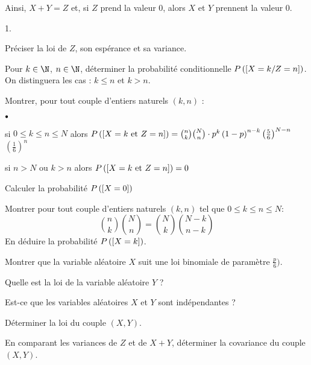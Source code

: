 \documentclass[11pt]{article}%
\begin{document}
Ainsi, $X + Y = Z$ et, si $Z$ prend la valeur 0, alors $X$ et $Y$
prennent la
valeur 0.

\begin{noliste}{1.}
 \setlength{\itemsep}{4mm}
\item Préciser la loi de $Z$, son espérance et sa variance.

\item Pour $k\in \N$, $n\in \N$, déterminer la
probabilité conditionnelle $P\left(\left[ {X = k/Z = n} \right]\right)$. On
distinguera les cas : $k\le
n $ et $k>n.$

\item Montrer, pour tout couple d'entiers naturels $(k,n)$ :

\begin{noliste}{$\scriptstyle \bullet$}
\item si $0\leq k\leq n\leq N$ alors $ P\left(\left[ { X = k\text{ et }Z =
n} \right]\right) = \binom{n}{k}\binom{N}{n}\cdot p^{k}\left( 1-p\right)
^{n-k}\left( \frac{5}{6}\right) ^{N-n}$ $\left( \frac{1}{6}\right)
^{n}$

\item si $n>N$ ou $k>n$ alors $ P\left(\left[ { X = k\text{ et }Z =
n} \right]\right) = 0$
\end{noliste}

\item Calculer la probabilité $P\left(\left[ {X = 0} \right]\right)$

\item Montrer pour tout couple d'entiers naturels $(k,n)$ tel que
$0\leq
k\leq n\leq N :$
\[
\binom{n}{k}\binom{N}{n} = \binom{N}{k}\binom{N-k}{n-k} 
\]
En déduire la probabilité $P\left(\left[ {X = k} \right]\right)$.

\item Montrer que la variable aléatoire $X$ suit une loi binomiale de
paramètre $\frac{p}{6})$.

Quelle est la loi de la variable aléatoire $Y$ ?

\item Est-ce que les variables aléatoires $X$ et $Y$ sont indépendantes
?

Déterminer la loi du couple $(X,Y)$.

\item En comparant les variances de $Z$ et de $X + Y$, déterminer la
covariance du couple $(X,Y)$.
\end{noliste}
\end{document}
